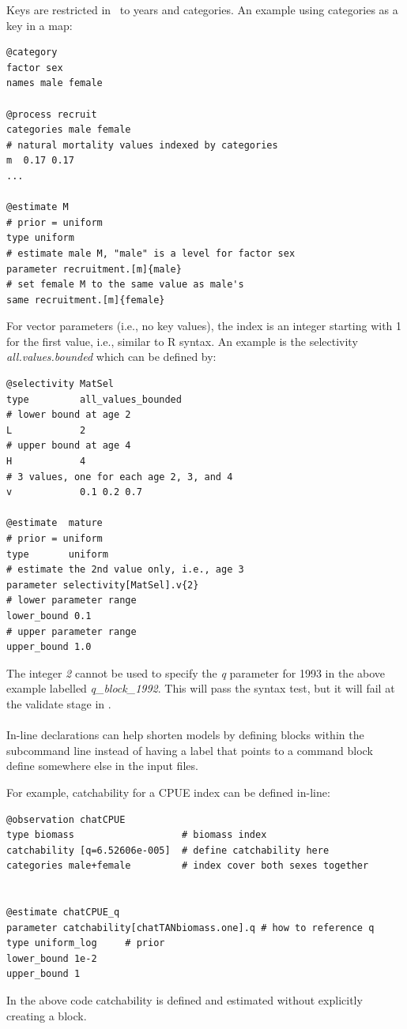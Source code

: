 Keys are restricted in \CNAME\ to years and categories. An example using categories as a key in a map:

{\small{\begin{verbatim}
@category
factor sex
names male female

@process recruit
categories male female
# natural mortality values indexed by categories
m  0.17 0.17
...

@estimate M
# prior = uniform
type uniform
# estimate male M, "male" is a level for factor sex
parameter recruitment.[m]{male}
# set female M to the same value as male's
same recruitment.[m]{female}
\end{verbatim}}}

For vector parameters (i.e., no key values), the index is an integer starting with 1 for the first value, i.e., similar to R syntax. An example is the selectivity \textit{all.values.bounded} which can be defined by:

{\small{\begin{verbatim}
@selectivity MatSel
type         all_values_bounded
# lower bound at age 2
L            2
# upper bound at age 4
H            4
# 3 values, one for each age 2, 3, and 4
v            0.1 0.2 0.7

@estimate  mature
# prior = uniform
type       uniform
# estimate the 2nd value only, i.e., age 3
parameter selectivity[MatSel].v{2}
# lower parameter range
lower_bound 0.1
# upper parameter range
upper_bound 1.0
\end{verbatim}}}

The integer \textit{{2}} cannot be used to specify the \textit{q} parameter for 1993 in the above example labelled \textit{q\_block\_1992}. This will pass the syntax test, but it will fail at the validate stage in \CNAME.


\paragraph*{\label{sec:declare}}

In-line declarations can help shorten models by defining \command{} blocks within the subcommand line instead of having a label that points to a command block define somewhere else in the input files.

For example, catchability for a CPUE index can be defined in-line:

{\small{\begin{verbatim}
@observation chatCPUE
type biomass                   # biomass index
catchability [q=6.52606e-005]  # define catchability here
categories male+female         # index cover both sexes together


@estimate chatCPUE_q
parameter catchability[chatTANbiomass.one].q # how to reference q
type uniform_log     # prior
lower_bound 1e-2
upper_bound 1
\end{verbatim}}}

In the above code catchability is defined and estimated without explicitly creating a  block.


